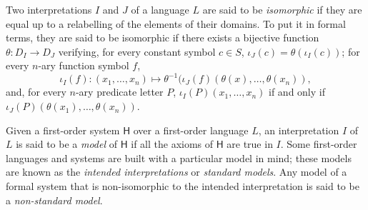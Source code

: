 \begin{definition}
Two interpretations $I$ and $J$ of a language $L$ are said to be \emph{isomorphic} if they are equal up to a relabelling of the elements of their domains.
To put it in formal terms, they are said to be isomorphic if there exists a bijective function $\theta: D_I \longrightarrow D_J$ verifying, for every constant symbol $c\in S$, $\iota_J(c) = \theta(\iota_I(c))$; for every $n$-ary function symbol $f$,
\[\iota_I(f):(x_1,\ldots,x_n)\longmapsto \theta^{-1}(\iota_J(f)(\theta(x),\ldots,\theta(x_n)),\]
and, for every $n$-ary predicate letter $P$, $\iota_I(P)(x_1,\ldots,x_n)$ if and only if $\iota_J(P)(\theta(x_1),\ldots,\theta(x_n))$. 

Given a first-order system $\mathsf{H}$ over a first-order language $L$, an interpretation $I$ of $L$ is said to be a \emph{model} of $\mathsf{H}$ if all the axioms of $\mathsf{H}$ are true in $I$.
Some first-order languages and systems are built with a particular model in mind; these models are known as the \emph{intended interpretations} or \emph{standard models}.
Any model of a formal system that is non-isomorphic to the intended interpretation is said to be a \emph{non-standard model}.
\label{<+label+>}
\end{definition}

